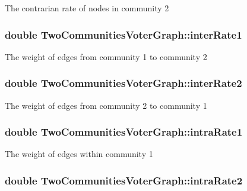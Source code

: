 The contrarian rate of nodes in community 2 \hypertarget{classTwoCommunitiesVoterGraph_af08c3b9a6e6f1dc8659a38ecd2d1afde}{
\subsubsection[{inter\-Rate1}]{\setlength{\rightskip}{0pt plus 5cm}double Two\-Communities\-Voter\-Graph\-::inter\-Rate1}}\label{classTwoCommunitiesVoterGraph_af08c3b9a6e6f1dc8659a38ecd2d1afde}
The weight of edges from community 1 to community 2 \hypertarget{classTwoCommunitiesVoterGraph_afab8bb5994f7fd1370d7d81caf7277d4}{
\subsubsection[{inter\-Rate2}]{\setlength{\rightskip}{0pt plus 5cm}double Two\-Communities\-Voter\-Graph\-::inter\-Rate2}}\label{classTwoCommunitiesVoterGraph_afab8bb5994f7fd1370d7d81caf7277d4}
The weight of edges from community 2 to community 1 \hypertarget{classTwoCommunitiesVoterGraph_a96a32ba7529177a7f6b73e827a57791e}{
\subsubsection[{intra\-Rate1}]{\setlength{\rightskip}{0pt plus 5cm}double Two\-Communities\-Voter\-Graph\-::intra\-Rate1}}\label{classTwoCommunitiesVoterGraph_a96a32ba7529177a7f6b73e827a57791e}
The weight of edges within community 1 \hypertarget{classTwoCommunitiesVoterGraph_a6e7ea06e014d75b7bf18441885e07e1e}{
\subsubsection[{intra\-Rate2}]{\setlength{\rightskip}{0pt plus 5cm}double Two\-Communities\-Voter\-Graph\-::intra\-Rate2}}\label{classTwoCommunitiesVoterGraph_a6e7ea06e014d75b7bf18441885e07e1e}
